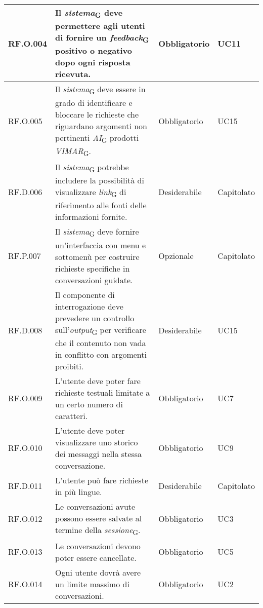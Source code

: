 \begin{table}[H]
\centering
    \begin{tabular}{|C{2.7cm}|L{7.2cm}|C{2.7cm}|C{2cm}|}
        \hline
        RF.O.004 & Il \textit{sistema}\textsubscript{G} deve permettere agli utenti di fornire un \textit{feedback}\textsubscript{G} positivo o negativo dopo ogni risposta ricevuta. & Obbligatorio & UC11 \\
        \hline
        RF.O.005 & Il \textit{sistema}\textsubscript{G} deve essere in grado di identificare e bloccare le richieste che riguardano argomenti non pertinenti \textit{AI}\textsubscript{G} prodotti \textit{VIMAR}\textsubscript{G}. & Obbligatorio & UC15 \\
        \hline
        RF.D.006 & Il \textit{sistema}\textsubscript{G} potrebbe includere la possibilità di visualizzare \textit{link}\textsubscript{G} di riferimento alle fonti delle informazioni fornite. & Desiderabile & Capitolato \\
        \hline
        RF.P.007 & Il \textit{sistema}\textsubscript{G} deve fornire un'interfaccia con menu e sottomenù per costruire richieste specifiche in conversazioni guidate. & Opzionale & Capitolato\\
        \hline
        RF.D.008 & Il componente di interrogazione deve prevedere un controllo sull’\textit{output}\textsubscript{G}
        per verificare che il contenuto non vada in conflitto con argomenti proibiti. & Desiderabile & UC15 \\
        \hline
        RF.O.009 & L’utente deve poter fare richieste testuali limitate a un certo numero di caratteri. & Obbligatorio & UC7 \\
        \hline
        RF.O.010 & L’utente deve poter visualizzare uno storico dei messaggi nella stessa
        conversazione. & Obbligatorio & UC9 \\
        \hline
        RF.D.011 & L’utente può fare richieste in più lingue.
         & Desiderabile & Capitolato \\
         \hline
         RF.O.012 & Le conversazioni avute possono essere salvate al termine della \textit{sessione}\textsubscript{G}. & Obbligatorio & UC3 \\
        \hline
        RF.O.013 & Le conversazioni devono poter essere cancellate. & Obbligatorio & UC5 \\
        \hline
        RF.O.014 & Ogni utente dovrà avere un limite massimo di conversazioni.
         & Obbligatorio & UC2 \\
        \hline

\end{tabular}
\end{table}
